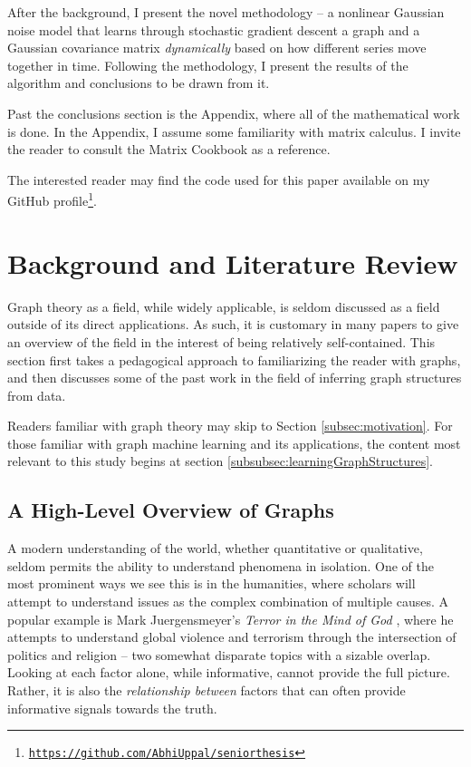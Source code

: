 \documentclass[12pt]{article}
\theoremstyle{definition}
\begin{document}
After the background, I present the novel methodology -- a nonlinear Gaussian noise model that learns through stochastic gradient descent a graph and a Gaussian covariance matrix \textit{dynamically} based on how different series move together in time. Following the methodology, I present the results of the algorithm and conclusions to be drawn from it. 

Past the conclusions section is the Appendix, where all of the mathematical work is done. In the Appendix, I assume some familiarity with matrix calculus. I invite the reader to consult the Matrix Cookbook \cite{matrixCookbook} as a reference.

The interested reader may find the code used for this paper available on my GitHub profile\footnote{\href{https://github.com/AbhiUppal/seniorthesis}{\texttt{https://github.com/AbhiUppal/seniorthesis}}}.

\section{Background and Literature Review}
\label{sec:Background}

Graph theory as a field, while widely applicable, is seldom discussed as a field outside of its direct applications. As such, it is customary in many papers to give an overview of the field in the interest of being relatively self-contained. This section first takes a pedagogical approach to familiarizing the reader with graphs, and then discusses some of the past work in the field of inferring graph structures from data.

Readers familiar with graph theory may skip to Section \ref{subsec:motivation}. For those familiar with graph machine learning and its applications, the content most relevant to this study begins at section \ref{subsubsec:learningGraphStructures}.

\subsection{A High-Level Overview of Graphs}
\label{sec:graphOverview}

A modern understanding of the world, whether quantitative or qualitative, seldom permits the ability to understand phenomena in isolation. One of the most prominent ways we see this is in the humanities, where scholars will attempt to understand issues as the complex combination of multiple causes. A popular example is Mark Juergensmeyer's \textit{Terror in the Mind of God} \cite{terrorInTheMindOfGod}, where he attempts to understand global violence and terrorism through the intersection of politics and religion -- two somewhat disparate topics with a sizable overlap. Looking at each factor alone, while informative, cannot provide the full picture. Rather, it is also the \textit{relationship between} factors that can often provide informative signals towards the truth.
\end{document}
